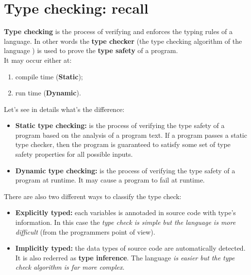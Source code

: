 \documentclass[12pt]{article}
\begin{document}
\maketitle
\tableofcontents
\listoftables
\listoffigures

	
\section{Type checking: recall }
	
		\textbf{Type checking} is the process of verifying and enforces the typing rules of a language. In other words the \textbf{type checker} (the type checking algorithm of the language ) is used to prove the \textbf{type safety} of a program.\\
		It may occur either at:
		
		\begin{enumerate}
			\item compile time (\textbf{Static});
			\item run time (\textbf{Dynamic}). 
		\end{enumerate}
	
		Let's see in details what's the difference:	
		
		\begin{itemize}
			\item \textbf{Static type checking: }is the process of verifying the type safety of a program based on the analysis of a program text.  If a program passes a static type checker, then the program is guaranteed to satisfy some set of type safety properties for all possible inputs.
			\item \textbf{Dynamic type checking:} is the process of verifying the type safety of a program at runtime. It may cause a program to fail at runtime.
		\end{itemize}
	
		There are also two different ways to classify the type check:
		
		\begin{itemize}
			\item \textbf{Explicitly typed:} each variables is annotaded in source code with type's information. In this case the \textit{type check is simple but the language is more difficult} (from the programmers point of view).
			\item \textbf{Implicitly typed:} the data types of source code are automatically detected. It is also rederred as \textbf{type inference}. The language \textit{is easier but the type check algorithm is far more complex}.
		\end{itemize}
	
\end{document}
